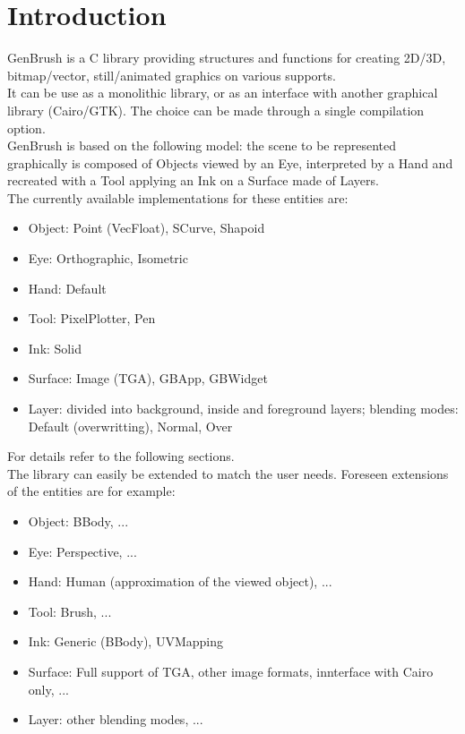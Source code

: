 \section*{Introduction}

GenBrush is a C library providing structures and functions for creating 2D/3D, bitmap/vector, still/animated graphics on various supports.\\

It can be use as a monolithic library, or as an interface with another graphical library (Cairo/GTK). The choice can be made through a single compilation option.\\

GenBrush is based on the following model: the scene to be represented graphically is composed of Objects viewed by an Eye, interpreted by a Hand and recreated with a Tool applying an Ink on a Surface made of Layers.\\

The currently available implementations for these entities are:\\
\begin{itemize}
\item Object: Point (VecFloat), SCurve, Shapoid
\item Eye: Orthographic, Isometric
\item Hand: Default
\item Tool: PixelPlotter, Pen
\item Ink: Solid
\item Surface: Image (TGA), GBApp, GBWidget
\item Layer: divided into background, inside and foreground layers; blending modes: Default (overwritting), Normal, Over
\end{itemize}
For details refer to the following sections.\\

The library can easily be extended to match the user needs. Foreseen extensions of the entities are for example:\\
\begin{itemize}
\item Object: BBody, ...
\item Eye: Perspective, ...
\item Hand: Human (approximation of the viewed object), ...
\item Tool: Brush, ...
\item Ink: Generic (BBody), UVMapping
\item Surface: Full support of TGA, other image formats, innterface with Cairo only, ...
\item Layer: other blending modes, ...
\end{itemize}


